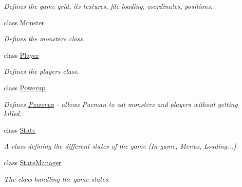 \begin{DoxyCompactItemize}
\begin{DoxyCompactList}\small\item\em Defines the game grid, its textures, file loading, coordinates, positions. \end{DoxyCompactList}\item 
class \hyperlink{classns_game_1_1_monster}{Monster}
\begin{DoxyCompactList}\small\item\em Defines the monsters class. \end{DoxyCompactList}\item 
class \hyperlink{classns_game_1_1_player}{Player}
\begin{DoxyCompactList}\small\item\em Defines the player\textquotesingle{}s class. \end{DoxyCompactList}\item 
class \hyperlink{classns_game_1_1_powerup}{Powerup}
\begin{DoxyCompactList}\small\item\em Defines \hyperlink{classns_game_1_1_powerup}{Powerup} -\/ allows Pacman to eat monsters and players without getting killed. \end{DoxyCompactList}\item 
class \hyperlink{structns_game_1_1_state}{State}
\begin{DoxyCompactList}\small\item\em A class defining the different states of the game (In-\/game, Menus, Loading...) \end{DoxyCompactList}\item 
class \hyperlink{classns_game_1_1_state_manager}{State\+Manager}
\begin{DoxyCompactList}\small\item\em The class handling the game states. \end{DoxyCompactList}\end{DoxyCompactItemize}

